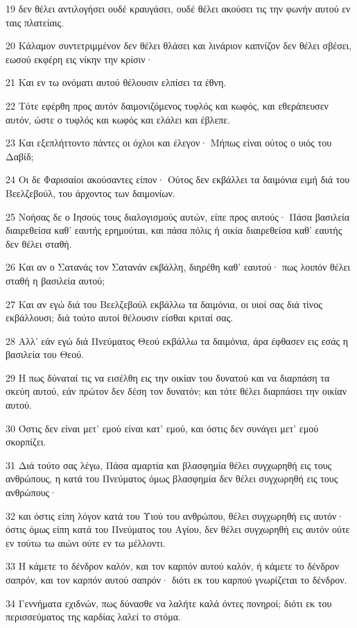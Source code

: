 \par 19 δεν θέλει αντιλογήσει ουδέ κραυγάσει, ουδέ θέλει ακούσει τις την φωνήν αυτού εν ταις πλατείαις.
\par 20 Κάλαμον συντετριμμένον δεν θέλει θλάσει και λινάριον καπνίζον δεν θέλει σβέσει, εωσού εκφέρη εις νίκην την κρίσιν·
\par 21 Και εν τω ονόματι αυτού θέλουσιν ελπίσει τα έθνη.
\par 22 Τότε εφέρθη προς αυτόν δαιμονιζόμενος τυφλός και κωφός, και εθεράπευσεν αυτόν, ώστε ο τυφλός και κωφός και ελάλει και έβλεπε.
\par 23 Και εξεπλήττοντο πάντες οι όχλοι και έλεγον· Μήπως είναι ούτος ο υιός του Δαβίδ;
\par 24 Οι δε Φαρισαίοι ακούσαντες είπον· Ούτος δεν εκβάλλει τα δαιμόνια ειμή διά του Βεελζεβούλ, του άρχοντος των δαιμονίων.
\par 25 Νοήσας δε ο Ιησούς τους διαλογισμούς αυτών, είπε προς αυτούς· Πάσα βασιλεία διαιρεθείσα καθ' εαυτής ερημούται, και πάσα πόλις ή οικία διαιρεθείσα καθ' εαυτής δεν θέλει σταθή.
\par 26 Και αν ο Σατανάς τον Σατανάν εκβάλλη, διηρέθη καθ' εαυτού· πως λοιπόν θέλει σταθή η βασιλεία αυτού;
\par 27 Και αν εγώ διά του Βεελζεβούλ εκβάλλω τα δαιμόνια, οι υιοί σας διά τίνος εκβάλλουσι; διά τούτο αυτοί θέλουσιν είσθαι κριταί σας.
\par 28 Αλλ' εάν εγώ διά Πνεύματος Θεού εκβάλλω τα δαιμόνια, άρα έφθασεν εις εσάς η βασιλεία του Θεού.
\par 29 Η πως δύναταί τις να εισέλθη εις την οικίαν του δυνατού και να διαρπάση τα σκεύη αυτού, εάν πρώτον δεν δέση τον δυνατόν; και τότε θέλει διαρπάσει την οικίαν αυτού.
\par 30 Όστις δεν είναι μετ' εμού είναι κατ' εμού, και όστις δεν συνάγει μετ' εμού σκορπίζει.
\par 31 Διά τούτο σας λέγω, Πάσα αμαρτία και βλασφημία θέλει συγχωρηθή εις τους ανθρώπους, η κατά του Πνεύματος όμως βλασφημία δεν θέλει συγχωρηθή εις τους ανθρώπους·
\par 32 και όστις είπη λόγον κατά του Υιού του ανθρώπου, θέλει συγχωρηθή εις αυτόν· όστις όμως είπη κατά του Πνεύματος του Αγίου, δεν θέλει συγχωρηθή εις αυτόν ούτε εν τούτω τω αιώνι ούτε εν τω μέλλοντι.
\par 33 Η κάμετε το δένδρον καλόν, και τον καρπόν αυτού καλόν, ή κάμετε το δένδρον σαπρόν, και τον καρπόν αυτού σαπρόν· διότι εκ του καρπού γνωρίζεται το δένδρον.
\par 34 Γεννήματα εχιδνών, πως δύνασθε να λαλήτε καλά όντες πονηροί; διότι εκ του περισσεύματος της καρδίας λαλεί το στόμα.
